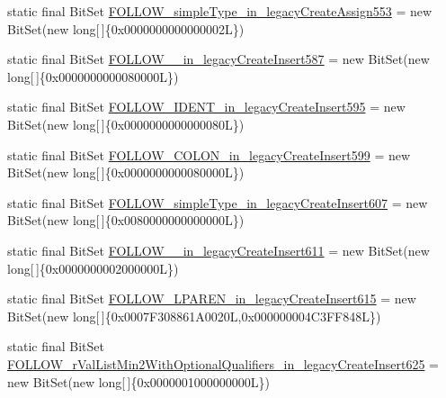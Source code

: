 \begin{DoxyCompactItemize}
static final Bit\-Set \hyperlink{classorg_1_1tzi_1_1use_1_1parser_1_1shell_1_1_shell_command_parser_aa3a3bedf6f87bfb3d248a1bf8ecbb65e}{F\-O\-L\-L\-O\-W\-\_\-simple\-Type\-\_\-in\-\_\-legacy\-Create\-Assign553} = new Bit\-Set(new long\mbox{[}$\,$\mbox{]}\{0x0000000000000002\-L\})
\item 
static final Bit\-Set \hyperlink{classorg_1_1tzi_1_1use_1_1parser_1_1shell_1_1_shell_command_parser_a4e0e9a25e10ff40d18922afd1f7aa480}{F\-O\-L\-L\-O\-W\-\_\-\_\-in\-\_\-legacy\-Create\-Insert587} = new Bit\-Set(new long\mbox{[}$\,$\mbox{]}\{0x0000000000080000\-L\})
\item 
static final Bit\-Set \hyperlink{classorg_1_1tzi_1_1use_1_1parser_1_1shell_1_1_shell_command_parser_aae546497a277d02fa231e3d5f0af90f6}{F\-O\-L\-L\-O\-W\-\_\-\-I\-D\-E\-N\-T\-\_\-in\-\_\-legacy\-Create\-Insert595} = new Bit\-Set(new long\mbox{[}$\,$\mbox{]}\{0x0000000000000080\-L\})
\item 
static final Bit\-Set \hyperlink{classorg_1_1tzi_1_1use_1_1parser_1_1shell_1_1_shell_command_parser_a8605082d8b79f098e3062ed9e0e7c2e3}{F\-O\-L\-L\-O\-W\-\_\-\-C\-O\-L\-O\-N\-\_\-in\-\_\-legacy\-Create\-Insert599} = new Bit\-Set(new long\mbox{[}$\,$\mbox{]}\{0x0000000000080000\-L\})
\item 
static final Bit\-Set \hyperlink{classorg_1_1tzi_1_1use_1_1parser_1_1shell_1_1_shell_command_parser_a74eb0d74a186d12713d7a0aa6fa35096}{F\-O\-L\-L\-O\-W\-\_\-simple\-Type\-\_\-in\-\_\-legacy\-Create\-Insert607} = new Bit\-Set(new long\mbox{[}$\,$\mbox{]}\{0x0080000000000000\-L\})
\item 
static final Bit\-Set \hyperlink{classorg_1_1tzi_1_1use_1_1parser_1_1shell_1_1_shell_command_parser_a9e516e09f342bd16d8a7a29bd945bb05}{F\-O\-L\-L\-O\-W\-\_\-\_\-in\-\_\-legacy\-Create\-Insert611} = new Bit\-Set(new long\mbox{[}$\,$\mbox{]}\{0x0000000002000000\-L\})
\item 
static final Bit\-Set \hyperlink{classorg_1_1tzi_1_1use_1_1parser_1_1shell_1_1_shell_command_parser_a3c57e6064d93e89a0f8a38acb8d093d0}{F\-O\-L\-L\-O\-W\-\_\-\-L\-P\-A\-R\-E\-N\-\_\-in\-\_\-legacy\-Create\-Insert615} = new Bit\-Set(new long\mbox{[}$\,$\mbox{]}\{0x0007\-F308861\-A0020\-L,0x000000004\-C3\-F\-F848\-L\})
\item 
static final Bit\-Set \hyperlink{classorg_1_1tzi_1_1use_1_1parser_1_1shell_1_1_shell_command_parser_a6c828e4e090270e9f0403f77f8387df4}{F\-O\-L\-L\-O\-W\-\_\-r\-Val\-List\-Min2\-With\-Optional\-Qualifiers\-\_\-in\-\_\-legacy\-Create\-Insert625} = new Bit\-Set(new long\mbox{[}$\,$\mbox{]}\{0x0000001000000000\-L\})

\end{DoxyCompactItemize}
